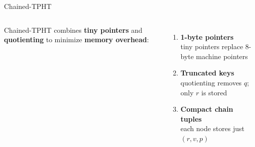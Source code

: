 \documentclass[aspectratio=169,10pt]{beamer}
\newcommand{\Chained}{Chained-TPHT\xspace}
\newcommand{\keyterm}[1]{\textcolor{CornellRed}{\textbf{#1}}}
\begin{document}
\begin{frame}{Chained-TPHT}
  \vspace{0.10cm}
  \begin{columns}[T,onlytextwidth]
      {\Large \Chained combines \keyterm{tiny pointers} and
       \keyterm{quotienting} to minimize \textbf{memory overhead}:}\par
      \vspace{0.20cm}
      \begin{enumerate}\large
        \item \textbf{1-byte pointers}\\[-1pt]
          {\large tiny pointers replace 8-byte machine pointers}
          \vspace{0.18cm}
        \item \textbf{Truncated keys}\\[-1pt]
          {\large quotienting removes \(q\); only \(r\) is stored}
          \vspace{0.18cm}
        \item \textbf{Compact chain tuples}\\[-1pt]
          {\large each node stores just \((r,v,p)\)}
      \end{enumerate}
      \vspace{1.35cm}
      \centering
      \hspace*{-1.20cm}%
  \end{columns}
\end{frame}
\end{document}
